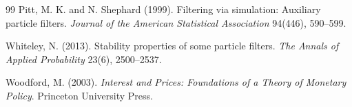 \documentclass[11pt]{article}
\theoremstyle{remark}
\begin{document}
\begin{thebibliography}{99}
Pitt, M. K. and N. Shephard (1999).
\newblock Filtering via simulation: Auxiliary particle filters.
\newblock \emph{Journal of the American Statistical Association} 94(446), 590--599.

Whiteley, N. (2013).
\newblock Stability properties of some particle filters.
\newblock \emph{The Annals of Applied Probability} 23(6), 2500--2537.

Woodford, M. (2003).
\newblock \emph{Interest and Prices: Foundations of a Theory of Monetary Policy}.
\newblock Princeton University Press.

\end{thebibliography}
\end{document}
